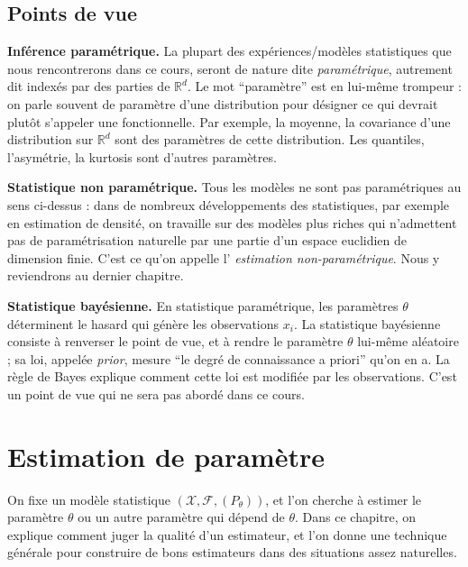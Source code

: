 \documentclass[
  10,
  letterpaper,
  DIV=11,
  numbers=noendperiod]{scrreport}
\theoremstyle{plain}
\theoremstyle{definition}
\theoremstyle{plain}
\theoremstyle{definition}
\theoremstyle{definition}
\theoremstyle{plain}
\theoremstyle{remark}
\begin{document}
\hypertarget{points-de-vue}{%
\section{Points de vue}\label{points-de-vue}}

\textbf{Inférence paramétrique.} La plupart des expériences/modèles
statistiques que nous rencontrerons dans ce cours, seront de nature dite
\emph{paramétrique}, autrement dit indexés par des parties de
\(\mathbb{R}^d\). Le mot ``paramètre'' est en lui-même trompeur : on
parle souvent de paramètre d'une distribution pour désigner ce qui
devrait plutôt s'appeler une fonctionnelle. Par exemple, la moyenne, la
covariance d'une distribution sur \(\mathbb{R}^d\) sont des paramètres
de cette distribution. Les quantiles, l'asymétrie, la kurtosis sont
d'autres paramètres.

\textbf{Statistique non paramétrique.} Tous les modèles ne sont pas
paramétriques au sens ci-dessus : dans de nombreux développements des
statistiques, par exemple en estimation de densité, on travaille sur des
modèles plus riches qui n'admettent pas de paramétrisation naturelle par
une partie d'un espace euclidien de dimension finie. C'est ce qu'on
appelle l' \emph{estimation non-paramétrique}. Nous y reviendrons au
dernier chapitre.

\textbf{Statistique bayésienne.} En statistique paramétrique, les
paramètres \(\theta\) déterminent le hasard qui génère les observations
\(x_i\). La statistique bayésienne consiste à renverser le point de vue,
et à rendre le paramètre \(\theta\) lui-même aléatoire ; sa loi, appelée
\emph{prior}, mesure ``le degré de connaissance a priori'' qu'on en a.
La règle de Bayes explique comment cette loi est modifiée par les
observations. C'est un point de vue qui ne sera pas abordé dans ce
cours.


\hypertarget{estimation-de-paramuxe8tre}{%
\chapter{Estimation de paramètre}\label{estimation-de-paramuxe8tre}}

On fixe un modèle statistique
\((\mathcal{X}, \mathscr{F}, (P_\theta))\), et l'on cherche à estimer le
paramètre \(\theta\) ou un autre paramètre qui dépend de \(\theta\).
Dans ce chapitre, on explique comment juger la qualité d'un estimateur,
et l'on donne une technique générale pour construire de bons estimateurs
dans des situations assez naturelles.
\end{document}
